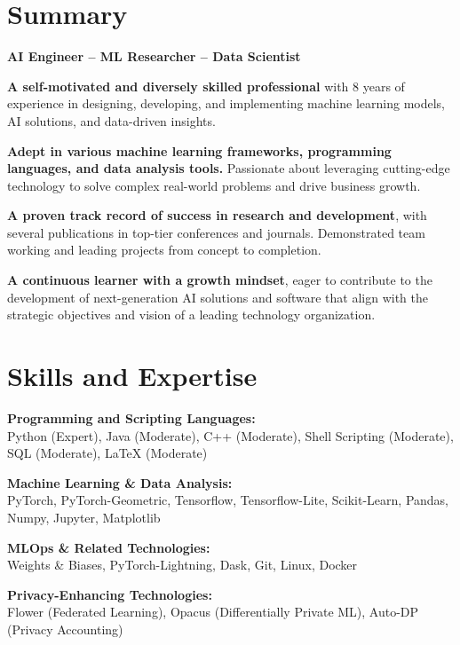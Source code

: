\documentclass[11pt]{article}
\begin{document}
\maketitle

\section{Summary}

\begin{outerlist}
	\item \textbf{AI Engineer -- ML Researcher -- Data Scientist}
	\begin{innerlist}
		\item \textbf{A self-motivated and diversely skilled professional} with 8 years of experience in designing, developing, and implementing machine learning models, AI solutions, and data-driven insights.
    \item \textbf{Adept in various machine learning frameworks, programming languages, and data analysis tools.} Passionate about leveraging cutting-edge technology to solve complex real-world problems and drive business growth.
    \item \textbf{A proven track record of success in research and development}, with several publications in top-tier conferences and journals. Demonstrated team working and leading projects from concept to completion.
    \item \textbf{A continuous learner with a growth mindset}, eager to contribute to the development of next-generation AI solutions and software that align with the strategic objectives and vision of a leading technology organization.
	\end{innerlist}
\end{outerlist}


\section{Skills and Expertise}

\begin{outerlist}
	\item \textbf{Programming and Scripting Languages:}\\
	{Python (Expert), Java (Moderate), C++ (Moderate), Shell Scripting (Moderate), SQL (Moderate), LaTeX (Moderate)}

	\item \textbf{Machine Learning \& Data Analysis:}\\
	{PyTorch, PyTorch-Geometric, Tensorflow, Tensorflow-Lite, Scikit-Learn, Pandas, Numpy, Jupyter, Matplotlib}

	\item \textbf{MLOps \& Related Technologies:}\\
	{Weights \& Biases, PyTorch-Lightning, Dask, Git, Linux, Docker}

	\item \textbf{Privacy-Enhancing Technologies:}\\
	{Flower (Federated Learning), Opacus (Differentially Private ML), Auto-DP (Privacy Accounting)}

\end{outerlist}
\end{document}
